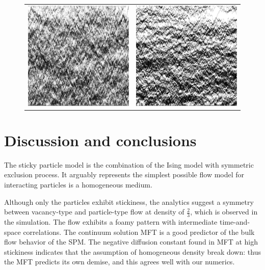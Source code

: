 \documentclass[
reprint, amsmath,amssymb,
]{revtex4-1}
\begin{document}
\begin{figure}[h!]
\begin{center}
\begin{tabular}{c | c}
    \includegraphics[width=0.49\linewidth]{longTime} &\includegraphics[width=0.49\linewidth]{midLongTime}
    \end{tabular}
\end{center}
    \vspace{-2em}
\end{figure}

\section{Discussion and conclusions}

The sticky particle model is the combination of the Ising model with
symmetric exclusion process.  It arguably represents the simplest
possible flow model for interacting particles is a homogeneous medium.

Although only the particles exhibit
stickiness, the analytics suggest a symmetry between vacancy-type and
particle-type flow at density of $\frac{2}{3}$, which is observed in
the simulation.  The flow exhibits a foamy pattern with intermediate
time-and-space correlations.  The continuum solution MFT is a good
predictor of the bulk flow behavior of the SPM.  The negative
diffusion constant found in MFT at high stickiness indicates that the
assumption of homogeneous density break down: thus the MFT predicts
its own demise, and this agrees well with our numerics.
\end{document}
